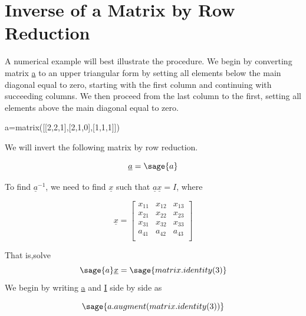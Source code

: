 \documentclass[12pt]{report}
\begin{document}
 
\section[Row Reduction]{Inverse of a Matrix by Row Reduction}\label{last}

A numerical example will best illustrate the procedure. We begin by
converting matrix \underline{a} to an upper triangular form by setting
all elements below the main diagonal equal to zero, starting with the
first column and continuing with succeeding columns. We then proceed
from the last column to the first, setting all elements above the main
diagonal equal to zero.

\begin{sagesilent}
	a=matrix([[2,2,1],[2,1,0],[1,1,1]])
\end{sagesilent}
We will invert the following matrix by row reduction.

\begin{equation}
	\underline{a} = \sage{a}
\end{equation}

To find $\underline{a}^{-1}$, we need to find $\underline{x}$ such that
$\underline{a}\underline{x}=I$, where

\begin{equation}
	\underline{x}=\left[\begin{array}{rrr}
	x_{11} & x_{12} & x_{13} \\
	x_{21} & x_{22} & x_{23} \\
	x_{31} & x_{32} & x_{33} \\
	a_{41} & a_{42} & a_{43}  \\
	\end{array}\right]
\end{equation}

That is,solve
\begin{equation} \sage{a}\underline{x} = \sage{matrix.identity(3)}
\end{equation}
We begin by writing \underline{a} and \underline{I} side by side as

\begin{equation}
	\sage{a.augment(matrix.identity(3))}
	\label{eq:inv1}
\end{equation}
\end{document}
